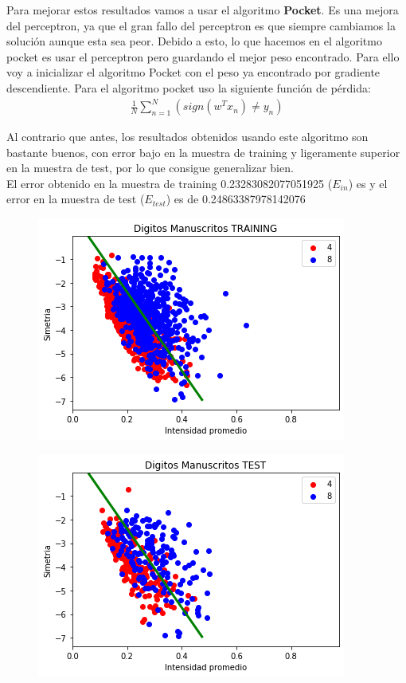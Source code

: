 \documentclass[a4paper,11pt]{article}
\begin{document}
Para mejorar estos resultados vamos a usar el algoritmo \textbf{Pocket}. Es una mejora del perceptron, ya que el gran fallo del perceptron es que siempre cambiamos la solución aunque esta sea peor. Debido a esto, lo que hacemos en el algoritmo pocket es usar el perceptron pero guardando el mejor peso encontrado. Para ello voy a inicializar el algoritmo Pocket con el peso ya encontrado por gradiente descendiente. Para el algoritmo pocket uso la siguiente función de pérdida:
\begin{align*}
\frac{1}{N} \displaystyle\sum_{n=1}^{N}( sign(w^T x_n) \neq y_n ) 
\end{align*}

Al contrario que antes, los resultados obtenidos usando este algoritmo son bastante buenos, con error bajo en la muestra de training y ligeramente superior en la muestra de test, por lo que consigue generalizar bien.\\

El error obtenido en la muestra de training 0.23283082077051925 ($E_{in}$) es  y el error en la muestra de test ($E_{test}$) es de 0.24863387978142076

\begin{figure}[h]
\includegraphics[scale=0.7]{ej3bP1}
\centering
\end{figure}

\begin{figure}[h]
\includegraphics[scale=0.7]{ej3bP2}
\centering
\end{figure}
\end{document}
